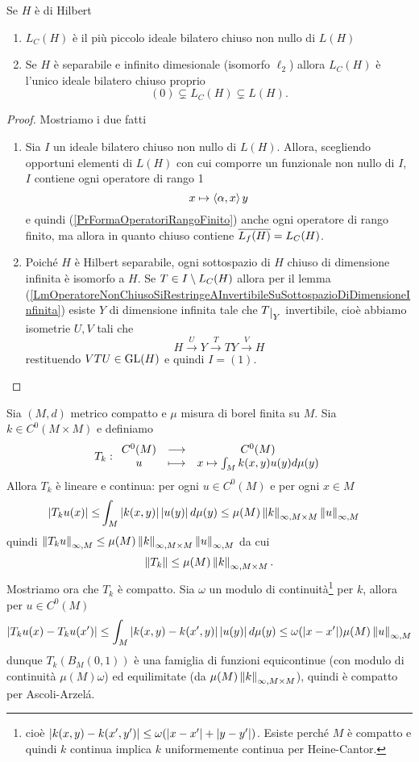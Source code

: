 \begin{exercise}
Se $H$ \`e di Hilbert
\begin{enumerate}
    \item $L_C(H)$ \`e il pi\`u piccolo ideale bilatero chiuso non nullo di $L(H)$
    \item Se $H$ \`e separabile e infinito dimesionale (isomorfo $\ell_2$) allora $L_C(H)$ \`e l'unico ideale bilatero chiuso proprio
    \[(0)\subsetneq L_C(H)\subsetneq L(H).\]
\end{enumerate}
\end{exercise}
\begin{proof}
Mostriamo i due fatti
\begin{enumerate}
    \item Sia $I$ un ideale bilatero chiuso non nullo di $L(H)$. Allora, scegliendo opportuni elementi di $L(H)$ con cui comporre un funzionale non nullo di $I$, $I$ contiene ogni operatore di rango 1
    \[x\mapsto \left\langle {\alpha,x}\right\rangle y\]
    e quindi (\ref{PrFormaOperatoriRangoFinito}) anche ogni operatore di rango finito, ma allora in quanto chiuso contiene $\overline{L_f(H)}=L_C(H)$.
    \item Poich\'e $H$ \`e Hilbert separabile, ogni sottospazio di $H$ chiuso di dimensione infinita \`e isomorfo a $H$. Se $T\in I\setminus L_C(H)$ allora per il lemma (\ref{LmOperatoreNonChiusoSiRestringeAInvertibileSuSottospazioDiDimensioneInfinita}) esiste $Y$ di dimensione infinita tale che $T\res Y$ invertibile, cio\`e abbiamo isometrie $U,V$ tali che
    \[H\xrightarrow{U} Y\xrightarrow{T}  TY \xrightarrow{V} H\]
    restituendo $VTU\in \mathrm{GL}(H)$ e quindi $I=(1)$.
\end{enumerate}
\end{proof}

\begin{example}
Sia $(M,d)$ metrico compatto e $\mu$ misura di borel finita su $M$. Sia $k\in C^0(M\times M)$ e definiamo
\[T_k:\begin{array}{ccc} {C^0(M)} & \longrightarrow & {C^0(M)}\\ {u} & \longmapsto & {x\mapsto\int_M k(x,y)u(y)d\mu(y)} \end{array}\]
Allora $T_k$ \`e lineare e continua: per ogni $u\in C^0(M)$ e per ogni $x\in M$
\begin{align*}
\left|{T_ku(x)}\right|\leq&\int_M\left|{k(x,y)}\right|\left|{u(y)}\right|d\mu(y)\leq \mu(M)\left\Vert{k}\right\Vert_{\infty,M\times M}\left\Vert{u}\right\Vert_{\infty,M}
\end{align*}
quindi $\left\Vert{T_k u}\right\Vert_{\infty,M}\leq \mu(M)\left\Vert{k}\right\Vert_{\infty,M\times M}\left\Vert{u}\right\Vert_{\infty,M}$ da cui
\[\left\Vert{T_k}\right\Vert\leq \mu(M)\left\Vert{k}\right\Vert_{\infty,M\times M}.\]
Mostriamo ora che $T_k$ \`e compatto. Sia $\omega$ un modulo di continuit\`a\footnote{cio\`e $\left|{k(x,y)-k(x',y')}\right|\leq \omega(\left|{x-x'}\right|+\left|{y-y'}\right|)$. Esiste perch\'e $M$ \`e compatto e quindi $k$ continua implica $k$ uniformemente continua per Heine-Cantor.} per $k$, allora per $u\in C^0(M)$
\[\left|{T_ku(x)-T_ku(x')}\right|\leq \int_M\left|{k(x,y)-k(x',y)}\right|\left|{u(y)}\right|d\mu(y)\leq \omega(\left|{x-x'}\right|)\mu(M)\left\Vert{u}\right\Vert_{\infty,M}\]
dunque $T_k(B_M(0,1))$ \`e una famiglia di funzioni equicontinue (con modulo di continuit\`a $\mu(M)\omega$) ed equilimitate (da $\mu(M)\left\Vert{k}\right\Vert_{\infty,M\times M}$), quindi \`e compatto per Ascoli-Arzel\'a.
\end{example}

